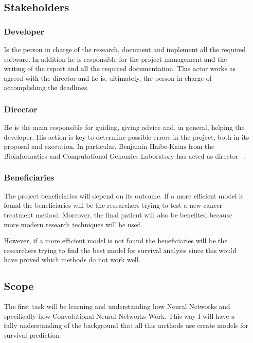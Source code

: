 \subsection{Stakeholders}

\subsubsection{Developer}
Is the person in charge of the research, document and implement all the required software.
In addition he is responsible for the project management and the writing of the report
and all the required documentation. This actor works as agreed with the director and
he is, ultimately, the person in charge of accomplishing the deadlines.

\subsubsection{Director}
He is the main responsible for guiding, giving advice and, in general, helping the developer.
His action is key to determine possible errors in the project, both in its proposal and 
execution. In particular, Benjamin Haibe-Kains from the Bioinformatics and Computational
Genomics Laboratory has acted as director
~\cites{bhklab}.

\subsubsection{Beneficiaries}
The project beneficiaries will depend on its outcome. If a more efficient model is found the
beneficiaries will be the researchers trying to test a new cancer treatment method. Moreover,
the final patient will also be benefited because more modern research techniques will be used.

However, if a more efficient model is not found the beneficiaries will be the researchers
trying to find the best model for survival analysis since this would have proved which 
methods do not work well.

\subsection{Scope}

The first task will be learning and understanding how Neural Networks and specifically how 
Convolutional Neural Networks Work. This way I will have a fully understanding of the background
that all this methods use create models for survival prediction.

